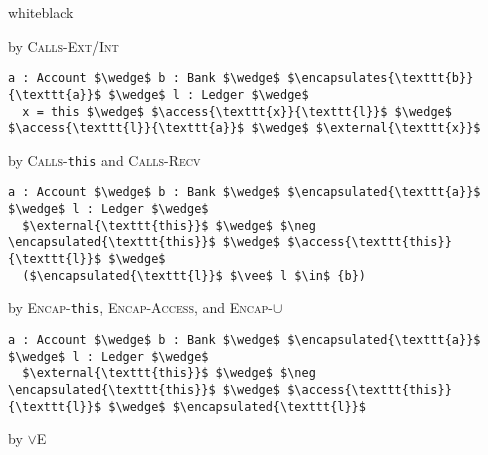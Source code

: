 \documentclass[acmsmall,review,anonymous]{acmart}\settopmatter{printfolios=true,printccs=false,printacmref=false}
\begin{document}
\begin{proofBox}{white}{black}
\begin{minipage}{0.75\textwidth}
\end{minipage}
\begin{minipage}{0.24\textwidth}
\scriptsize
\hfill by \textsc{Calls-Ext/Int}
\end{minipage}
\begin{minipage}{0.75\textwidth}
\begin{lstlisting}[language = Chainmail, mathescape=true]
a : Account $\wedge$ b : Bank $\wedge$ $\encapsulates{\texttt{b}}{\texttt{a}}$ $\wedge$ l : Ledger $\wedge$ 
  x = this $\wedge$ $\access{\texttt{x}}{\texttt{l}}$ $\wedge$ $\access{\texttt{l}}{\texttt{a}}$ $\wedge$ $\external{\texttt{x}}$
\end{lstlisting}
\end{minipage}
\begin{minipage}{0.24\textwidth}
\scriptsize
\hfill by \textsc{Calls-}\texttt{this} and \textsc{Calls-Recv}
\end{minipage}
\begin{minipage}{0.75\textwidth}
\begin{lstlisting}[language = Chainmail, mathescape=true]
a : Account $\wedge$ b : Bank $\wedge$ $\encapsulated{\texttt{a}}$ $\wedge$ l : Ledger $\wedge$
  $\external{\texttt{this}}$ $\wedge$ $\neg \encapsulated{\texttt{this}}$ $\wedge$ $\access{\texttt{this}}{\texttt{l}}$ $\wedge$ 
  ($\encapsulated{\texttt{l}}$ $\vee$ l $\in$ {b})
\end{lstlisting}
\end{minipage}
\begin{minipage}{0.24\textwidth}
\scriptsize
\hfill by \textsc{Encap-}\texttt{this}, \textsc{Encap-Access}, and \textsc{Encap-}$\cup$
\end{minipage}
\begin{minipage}{0.75\textwidth}
\begin{lstlisting}[language = Chainmail, mathescape=true]
a : Account $\wedge$ b : Bank $\wedge$ $\encapsulated{\texttt{a}}$ $\wedge$ l : Ledger $\wedge$ 
  $\external{\texttt{this}}$ $\wedge$ $\neg \encapsulated{\texttt{this}}$ $\wedge$ $\access{\texttt{this}}{\texttt{l}}$ $\wedge$ $\encapsulated{\texttt{l}}$
\end{lstlisting}
\end{minipage}
\begin{minipage}{0.24\textwidth}
\scriptsize
\hfill by $\vee$\textsc{E}
\end{minipage}
\begin{minipage}{0.75\textwidth}
\begin{lstlisting}[language = Chainmail, mathescape=true]

\end{lstlisting}
\end{minipage}
\end{proofBox}
\end{document}
